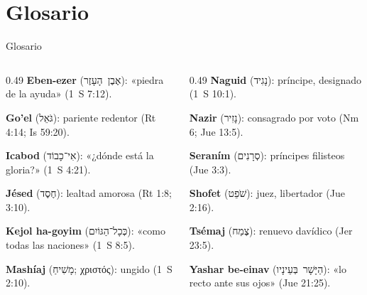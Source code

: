 \documentclass[hyperref={bookmarks=false},aspectratio=169]{beamer}
\newcommand{\heb}[1]{\mbox{\foreignlanguage{hebrew}{#1}}}
\newcommand{\grc}[1]{\foreignlanguage{ancientgreek}{#1}}
\begin{document}
\section{Glosario}
\begin{frame}{Glosario}
\begin{columns}[t,onlytextwidth]
\begin{column}{0.49\textwidth}\scriptsize
\textbf{Eben-ezer} (\heb{אֶבֶן הָעָזֶר}): «piedra de la ayuda» (1~S 7:12).\par\smallskip
\textbf{Go'el} (\heb{גֹּאֵל}): pariente redentor (Rt 4:14; Is 59:20).\par\smallskip
\textbf{Icabod} (\heb{אִי־כָבוֹד}): «¿dónde está la gloria?» (1~S 4:21).\par\smallskip
\textbf{Jésed} (\heb{חֶסֶד}): lealtad amorosa (Rt 1:8; 3:10).\par\smallskip
\textbf{Kejol ha-goyim} (\heb{כְּכָל־הַגּוֹיִם}): «como todas las naciones» (1~S 8:5).\par\smallskip
\textbf{Mashíaj} (\heb{מָשִׁיחַ}; \grc{χριστός}): ungido (1~S 2:10).
\end{column}
\begin{column}{0.49\textwidth}\scriptsize
\textbf{Naguid} (\heb{נָגִיד}): príncipe, designado (1~S 10:1).\par\smallskip
\textbf{Nazir} (\heb{נָזִיר}): consagrado por voto (Nm 6; Jue 13:5).\par\smallskip
\textbf{Seraním} (\heb{סְרָנִים}): príncipes filisteos (Jue 3:3).\par\smallskip
\textbf{Shofet} (\heb{שֹׁפֵט}): juez, libertador (Jue 2:16).\par\smallskip
\textbf{Tsémaj} (\heb{צֶמַח}): renuevo davídico (Jer 23:5).\par\smallskip
\textbf{Yashar be-einav} (\heb{הַיָּשָׁר בְּעֵינָיו}): «lo recto ante sus ojos» (Jue 21:25).
\end{column}
\end{columns}
\end{frame}

\end{document}
